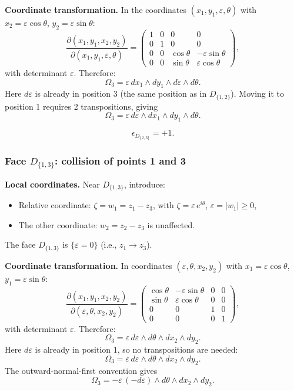 \textbf{Coordinate transformation.} In the coordinates $(x_1,y_1,\varepsilon,\theta)$ with $x_2 = \varepsilon\cos\theta$, $y_2 = \varepsilon\sin\theta$:
\[
\frac{\partial(x_1,y_1,x_2,y_2)}{\partial(x_1,y_1,\varepsilon,\theta)} = \begin{pmatrix} 1&0&0&0\\ 0&1&0&0\\ 0&0&\cos\theta&-\varepsilon\sin\theta\\ 0&0&\sin\theta&\varepsilon\cos\theta\end{pmatrix},
\]
with determinant $\varepsilon$. Therefore:
\[
\Omega_3 = \varepsilon\,dx_1\wedge dy_1\wedge d\varepsilon\wedge d\theta.
\]
Here $d\varepsilon$ is already in position 3 (the same position as in $D_{\{1,2\}}$). Moving it to position 1 requires 2 transpositions, giving
\[
\Omega_3 = \varepsilon\,d\varepsilon\wedge dx_1\wedge dy_1\wedge d\theta.
\]

\begin{equation}
\label{eq:eps-D23}
\boxed{\epsilon_{D_{\{2,3\}}} = +1.}
\end{equation}

\subsubsection{Face $D_{\{1,3\}}$: collision of points 1 and 3}

\textbf{Local coordinates.} Near $D_{\{1,3\}}$, introduce:
\begin{itemize}
\item Relative coordinate: $\zeta = w_1 = z_1 - z_3$, with $\zeta = \varepsilon\,e^{i\theta}$, $\varepsilon = |w_1| \ge 0$,
\item The other coordinate: $w_2 = z_2 - z_3$ is unaffected.
\end{itemize}
The face $D_{\{1,3\}}$ is $\{\varepsilon = 0\}$ (i.e., $z_1 \to z_3$).

\textbf{Coordinate transformation.} In coordinates $(\varepsilon,\theta,x_2,y_2)$ with $x_1 = \varepsilon\cos\theta$, $y_1 = \varepsilon\sin\theta$:
\[
\frac{\partial(x_1,y_1,x_2,y_2)}{\partial(\varepsilon,\theta,x_2,y_2)} = \begin{pmatrix}\cos\theta & -\varepsilon\sin\theta & 0&0\\ \sin\theta & \varepsilon\cos\theta & 0&0\\ 0&0&1&0\\ 0&0&0&1\end{pmatrix},
\]
with determinant $\varepsilon$. Therefore:
\[
\Omega_3 = \varepsilon\,d\varepsilon\wedge d\theta\wedge dx_2\wedge dy_2.
\]
Here $d\varepsilon$ is already in position 1, so no transpositions are needed:
\[
\Omega_3 = \varepsilon\,d\varepsilon\wedge d\theta\wedge dx_2\wedge dy_2.
\]
The outward-normal-first convention gives
\[
\Omega_3 = -\varepsilon\,(-d\varepsilon)\wedge d\theta\wedge dx_2\wedge dy_2.
\]


